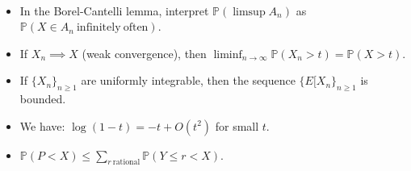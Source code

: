 \documentclass[12pt,reqno]{article}
\theoremstyle{plain}
\theoremstyle{definition}
\newcommand{\PP}[1]{\ensuremath{\mathbb{P}\left(#1\right)}}
\begin{document}
\begin{itemize}
\begin{align*}
      \end{align*} 
\item In the Borel-Cantelli lemma, interpret $\PP{\limsup A_n}$ as 
      $\PP{X \in A_n\mathrm{\ infinitely\ often}}$. 
\item If $X_n \implies X$ (weak convergence), then 
      $\liminf_{n \rightarrow \infty} \PP{X_n > t} = \PP{X > t}$. 
\item If $\{X_n\}_{n \geq 1}$ are uniformly integrable, then 
      the sequence $\{E[X_n\}_{n \geq 1}$ is bounded. 
\item We have: $\log(1-t) = -t + O(t^2)$ for small $t$. 
\item $\PP{P < X} \leq \sum_{r\mathrm{\ rational}} \PP{Y \leq r < X}$. 

\end{itemize} 
\end{document}
